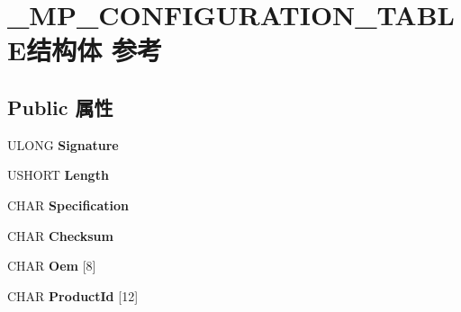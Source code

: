 \hypertarget{struct___m_p___c_o_n_f_i_g_u_r_a_t_i_o_n___t_a_b_l_e}{}\section{\+\_\+\+M\+P\+\_\+\+C\+O\+N\+F\+I\+G\+U\+R\+A\+T\+I\+O\+N\+\_\+\+T\+A\+B\+L\+E结构体 参考}
\label{struct___m_p___c_o_n_f_i_g_u_r_a_t_i_o_n___t_a_b_l_e}
\subsection*{Public 属性}
\begin{DoxyCompactItemize}
\item 
\mbox{\label{struct___m_p___c_o_n_f_i_g_u_r_a_t_i_o_n___t_a_b_l_e_a9355c7a63b9ded5b1b48a6e1b1e0031b}} 
U\+L\+O\+NG {\bfseries Signature}
\item 
\mbox{\label{struct___m_p___c_o_n_f_i_g_u_r_a_t_i_o_n___t_a_b_l_e_ad7f1dfe39052da1414c4bb4dfa3f458c}} 
U\+S\+H\+O\+RT {\bfseries Length}
\item 
\mbox{\label{struct___m_p___c_o_n_f_i_g_u_r_a_t_i_o_n___t_a_b_l_e_a61f91b1db01fb1e4a1af1e65d710b05d}} 
C\+H\+AR {\bfseries Specification}
\item 
\mbox{\label{struct___m_p___c_o_n_f_i_g_u_r_a_t_i_o_n___t_a_b_l_e_a194046a573485e022e45c1851e5114c6}} 
C\+H\+AR {\bfseries Checksum}
\item 
\mbox{\label{struct___m_p___c_o_n_f_i_g_u_r_a_t_i_o_n___t_a_b_l_e_ac3249f7fe90e37b65747c45c76600856}} 
C\+H\+AR {\bfseries Oem} \mbox{[}8\mbox{]}
\item 
\mbox{\label{struct___m_p___c_o_n_f_i_g_u_r_a_t_i_o_n___t_a_b_l_e_afac121a4af193a8daaf72e1ec98c7030}} 
C\+H\+AR {\bfseries Product\+Id} \mbox{[}12\mbox{]}
\item 
\mbox{\label{struct___m_p___c_o_n_f_i_g_u_r_a_t_i_o_n___t_a_b_l_e_ab78922db70ae990c9852c809f17afdef}} 

\end{DoxyCompactItemize}
